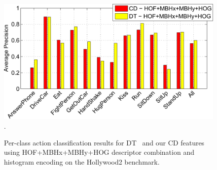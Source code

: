 \documentclass[10pt,twocolumn,letterpaper]{article}
\begin{document}


\begin{figure}
\begin{center}
\includegraphics[width=.9\linewidth]{figures/hollywood2-per-class-barplot-crop.pdf}.
\caption{Per-class action classification results for DT~\cite{Wang12} and our  CD features using HOF+MBHx+MBHy+HOG descriptor combination and histogram encoding on the Hollywood2 benchmark.\vspace{-.1cm}}
\label{fig:hwd2-barplot}
\end{center}
\end{figure}
\end{document}
